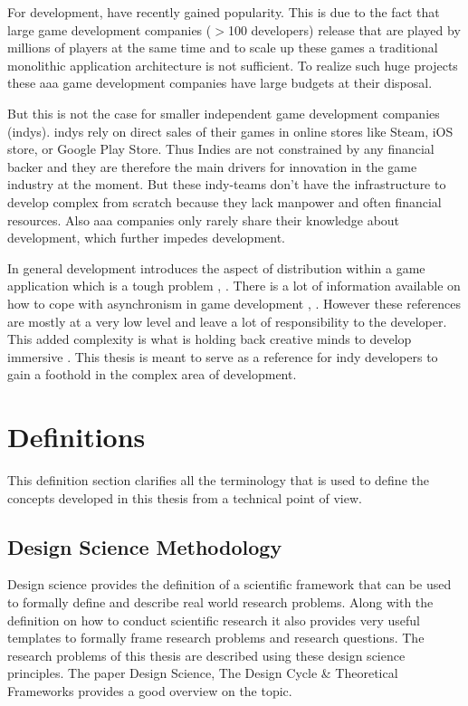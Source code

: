 For \og{} development, \mss{} have recently gained popularity. This is due to
the fact that large game development companies ($>$100 developers) release
\ogs{} that are played by millions of players at the same time
\cite{pronschinske2015turbine} and to scale up these games a traditional
monolithic application architecture is not sufficient. To realize such huge
\og{} projects these \gls{aaa} game development companies have large budgets at
their disposal.

But this is not the case for smaller independent game development companies
(\glspl{indy}). \Glspl{indy} rely on direct sales of their games in online
stores like Steam, iOS store, or Google Play Store. Thus Indies are not
constrained by any financial backer and they are therefore the main drivers for
innovation in the game industry at the moment. But these indy-teams don't have
the infrastructure to develop complex \ogs{} from scratch because they lack
manpower and often financial resources. Also \gls{aaa} companies only rarely
share their knowledge about \og{} development, which further impedes \og{}
development.

In general \og{} development introduces the aspect of distribution within a game
application which is a tough problem \cite{pneuli1990distributed},
\cite{kupermann2001synthesizing}. There is a lot of information available on how
to cope with asynchronism in game development \cite{gambetta_fast_paced},
\cite{gafferon2017games}. However these references are mostly at a very low
level and leave a lot of responsibility to the developer. This added complexity
is what is holding back creative minds to develop immersive \ogs{}. This thesis
is meant to serve as a reference for \gls{indy} developers to gain a foothold in
the complex area of \og{} development.

\section{Definitions}

This definition section clarifies all the terminology that is used to define the
concepts developed in this thesis from a technical point of view.

\subsection{Design Science Methodology}
\label{sub:dsm}

Design science provides the definition of a scientific framework that can be
used to formally define and describe real world research problems. Along with the
definition on how to conduct scientific research it also provides very useful
templates to formally frame research problems and research questions. The
research problems of this thesis are described using these design science
principles. The paper Design Science, The Design Cycle \& Theoretical Frameworks
\cite{biedermann2016design_science} provides a good overview on the topic.

